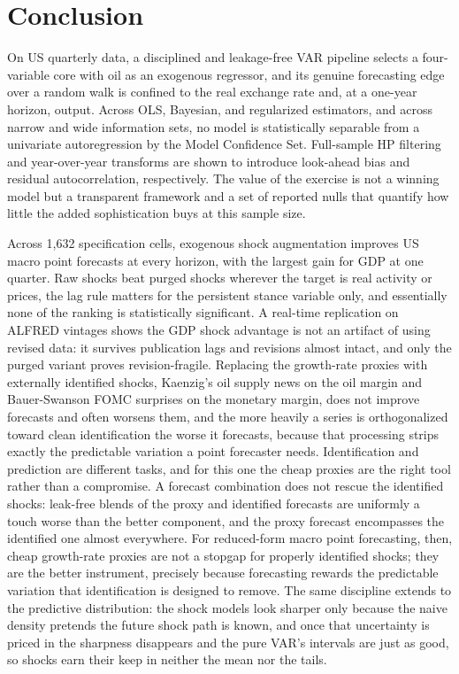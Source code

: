 \documentclass[conference]{IEEEtran}
\begin{document}
\section{Conclusion}
On US quarterly data, a disciplined and leakage-free VAR pipeline selects a four-variable core with oil as an exogenous regressor, and its genuine forecasting edge over a random walk is confined to the real exchange rate and, at a one-year horizon, output. Across OLS, Bayesian, and regularized estimators, and across narrow and wide information sets, no model is statistically separable from a univariate autoregression by the Model Confidence Set. Full-sample HP filtering and year-over-year transforms are shown to introduce look-ahead bias and residual autocorrelation, respectively. The value of the exercise is not a winning model but a transparent framework and a set of reported nulls that quantify how little the added sophistication buys at this sample size.

Across 1{,}632 specification cells, exogenous shock augmentation improves US macro point forecasts at every horizon, with the largest gain for GDP at one quarter. Raw shocks beat purged shocks wherever the target is real activity or prices, the lag rule matters for the persistent stance variable only, and essentially none of the ranking is statistically significant. A real-time replication on ALFRED vintages shows the GDP shock advantage is not an artifact of using revised data: it survives publication lags and revisions almost intact, and only the purged variant proves revision-fragile. Replacing the growth-rate proxies with externally identified shocks, Kaenzig's oil supply news on the oil margin and Bauer-Swanson FOMC surprises on the monetary margin, does not improve forecasts and often worsens them, and the more heavily a series is orthogonalized toward clean identification the worse it forecasts, because that processing strips exactly the predictable variation a point forecaster needs. Identification and prediction are different tasks, and for this one the cheap proxies are the right tool rather than a compromise. A forecast combination does not rescue the identified shocks: leak-free blends of the proxy and identified forecasts are uniformly a touch worse than the better component, and the proxy forecast encompasses the identified one almost everywhere. For reduced-form macro point forecasting, then, cheap growth-rate proxies are not a stopgap for properly identified shocks; they are the better instrument, precisely because forecasting rewards the predictable variation that identification is designed to remove. The same discipline extends to the predictive distribution: the shock models look sharper only because the naive density pretends the future shock path is known, and once that uncertainty is priced in the sharpness disappears and the pure VAR's intervals are just as good, so shocks earn their keep in neither the mean nor the tails.
\end{document}
